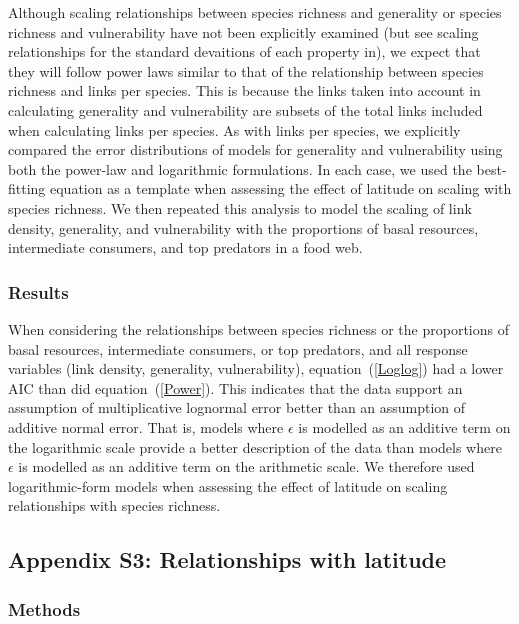 \documentclass[12pt]{article}
\begin{document}
    Although scaling relationships between species richness and generality or
    species richness and vulnerability have not been explicitly examined (but see scaling 
    relationships for the standard devaitions of each property in\citet{Riede2010}), we expect that they will follow
    power laws similar to that of the relationship between species richness and links per species.
    This is because the links taken into account in calculating generality and vulnerability are subsets 
    of the total links included when calculating links per species. As with links per species, we explicitly 
    compared the error distributions of models for generality and vulnerability using
    both the power-law and logarithmic formulations. 
    In each case, we used the best-fitting equation as a template when assessing the effect of latitude on scaling with
    species richness. We then repeated this analysis 
    to model the scaling of link density, generality, 
    and vulnerability with the proportions of basal 
    resources, intermediate consumers, and top predators
    in a food web.


  \subsubsection*{Results}

    When considering the relationships between species richness or the proportions 
    of basal resources, intermediate consumers, or top predators, and all response variables 
    (link density, generality, vulnerability), equation~(\ref{Loglog}) had a
    lower AIC than did equation~(\ref{Power}). This indicates that the
    data support an assumption of multiplicative lognormal error better than an
    assumption of additive normal error. That is, models where $\epsilon$ is
    modelled as an additive term on
    the logarithmic scale provide a better description of the data than models
    where $\epsilon$ is modelled as an additive term on the arithmetic scale.  
    We therefore used logarithmic-form models when assessing the
    effect of latitude on scaling relationships  with species richness.

\subsection*{Appendix S3: Relationships with latitude}

  \subsubsection*{Methods}
\end{document}
